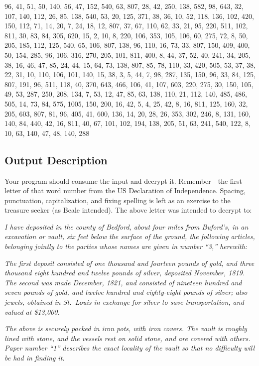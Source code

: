 96, 41, 51, 50, 140, 56, 47, 152, 540, 63, 807, 28, 42, 250, 138, 582,
98, 643, 32, 107, 140, 112, 26, 85, 138, 540, 53, 20, 125, 371, 38, 36,
10, 52, 118, 136, 102, 420, 150, 112, 71, 14, 20, 7, 24, 18, 12, 807,
37, 67, 110, 62, 33, 21, 95, 220, 511, 102, 811, 30, 83, 84, 305, 620,
15, 2, 10, 8, 220, 106, 353, 105, 106, 60, 275, 72, 8, 50, 205, 185,
112, 125, 540, 65, 106, 807, 138, 96, 110, 16, 73, 33, 807, 150, 409,
400, 50, 154, 285, 96, 106, 316, 270, 205, 101, 811, 400, 8, 44, 37, 52,
40, 241, 34, 205, 38, 16, 46, 47, 85, 24, 44, 15, 64, 73, 138, 807, 85,
78, 110, 33, 420, 505, 53, 37, 38, 22, 31, 10, 110, 106, 101, 140, 15,
38, 3, 5, 44, 7, 98, 287, 135, 150, 96, 33, 84, 125, 807, 191, 96, 511,
118, 40, 370, 643, 466, 106, 41, 107, 603, 220, 275, 30, 150, 105, 49,
53, 287, 250, 208, 134, 7, 53, 12, 47, 85, 63, 138, 110, 21, 112, 140,
485, 486, 505, 14, 73, 84, 575, 1005, 150, 200, 16, 42, 5, 4, 25, 42, 8,
16, 811, 125, 160, 32, 205, 603, 807, 81, 96, 405, 41, 600, 136, 14, 20,
28, 26, 353, 302, 246, 8, 131, 160, 140, 84, 440, 42, 16, 811, 40, 67,
101, 102, 194, 138, 205, 51, 63, 241, 540, 122, 8, 10, 63, 140, 47, 48,
140, 288

\subsection*{Output Description}\label{output-description-12}

Your program should consume the input and decrypt it. Remember - the
first letter of that word number from the US Declaration of
Independence. Spacing, punctuation, capitalization, and fixing spelling
is left as an exercise to the treasure seeker (as Beale intended). The
above letter was intended to decrypt to:

\emph{I have deposited in the county of Bedford, about four miles from
Buford's, in an excavation or vault, six feet below the surface of the
ground, the following articles, belonging jointly to the parties whose
names are given in number ``3,'' herewith:}

\emph{The first deposit consisted of one thousand and fourteen pounds of
gold, and three thousand eight hundred and twelve pounds of silver,
deposited November, 1819. The second was made December, 1821, and
consisted of nineteen hundred and seven pounds of gold, and twelve
hundred and eighty-eight pounds of silver; also jewels, obtained in
St.~Louis in exchange for silver to save transportation, and valued at
\$13,000.}

\emph{The above is securely packed in iron pots, with iron covers. The
vault is roughly lined with stone, and the vessels rest on solid stone,
and are covered with others. Paper number ``1'' describes the exact
locality of the vault so that no difficulty will be had in finding it.}

